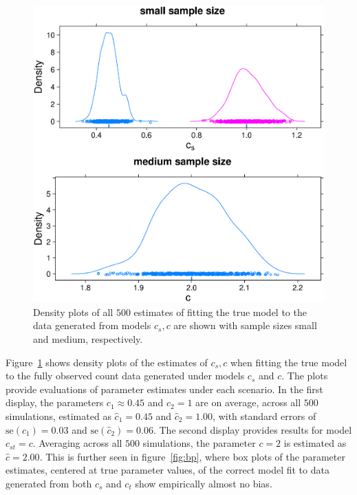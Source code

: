 \begin{figure}
  \centering
  \includegraphics[scale=0.5]{nonem}
  \caption{Density plots of all $500$ estimates of fitting the true model to the data generated from models $c_s,c$ are shown with sample sizes small and medium, respectively.}
  \label{fig:nonem}
\end{figure}


Figure~\ref{fig:nonem} shows density plots of the estimates of $c_s, c$ when fitting the true model to the fully observed count data generated under models $c_s$ and $c$.  The plots provide evaluations of parameter estimates under each scenario.  In the first display, the parameters $c_1 \approx 0.45$ and $c_2 = 1$ are on average, across all $500$ simulations, estimated as $\hat{c}_1 = 0.45$ and $\hat{c}_2 = 1.00$, with standard errors of $\text{se}(\hat{c}_1) = 0.03$ and $\text{se}(\hat{c}_2) = 0.06$.  The second display provides results for model $c_{st} = c$.  Averaging across all $500$ simulations, the parameter $c=2$ is estimated as $\hat{c} = 2.00$.  This is further seen in figure~\ref{fig:bp}, where box plots of the parameter estimates, centered at true parameter values, of the correct model fit to data generated from both $c_s$ and $c_t$ show empirically almost no bias.

